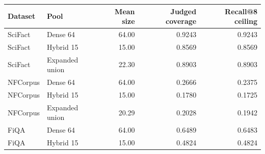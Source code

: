 \begin{tabular}{llrrr}
\toprule
Dataset & Pool & Mean size & Judged coverage & Recall@8 ceiling\\
\midrule
SciFact & Dense 64 & 64.00 & 0.9243 & 0.9243\\
SciFact & Hybrid 15 & 15.00 & 0.8569 & 0.8569\\
SciFact & Expanded union & 22.30 & 0.8903 & 0.8903\\
NFCorpus & Dense 64 & 64.00 & 0.2666 & 0.2375\\
NFCorpus & Hybrid 15 & 15.00 & 0.1780 & 0.1725\\
NFCorpus & Expanded union & 20.29 & 0.2028 & 0.1942\\
FiQA & Dense 64 & 64.00 & 0.6489 & 0.6483\\
FiQA & Hybrid 15 & 15.00 & 0.4824 & 0.4824\\
\bottomrule
\end{tabular}
